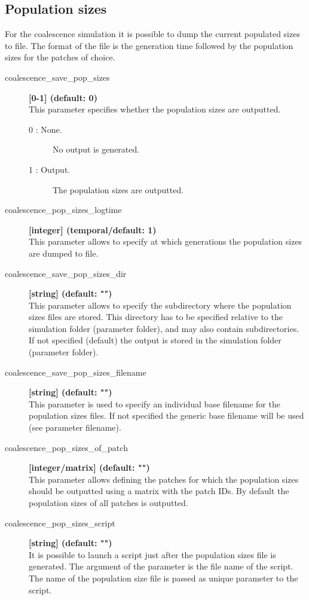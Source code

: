 \documentclass[letterpaper,12pt,oneside]{book}
\begin{document}
\subsection{Population sizes}\label{coalPopSizes}
For the coalescence simulation it is possible to dump the current populated sizes to file. The format of the file is the generation time followed by the population sizes for the patches of choice.

\begin{description} 
	\item[coalescence\_save\_pop\_sizes] \textbf{[0-1] (default: 0)} \\
	This parameter specifies whether the population sizes are outputted.
	\begin{description}
		\item [0 : None.] No output is generated.
		\item [1 : Output.] The population sizes are outputted.
	\end{description} 
	
	\item[coalescence\_pop\_sizes\_logtime] \textbf{[integer] (temporal/default: 1)}\\
	This parameter allows to specify at which generations the population sizes are dumped to file. 
	
\item[coalescence\_save\_pop\_sizes\_dir] \textbf{[string] (default: "")}\\
This parameter allows to specify the subdirectory where the population sizes files are stored. This directory has to be specified relative to the simulation folder (parameter \textsf{folder}), and may also contain subdirectories. If not specified (default) the output is stored in the simulation folder (parameter \textsf{folder}).

\item[coalescence\_save\_pop\_sizes\_filename] \textbf{[string] (default: "")}\\
This parameter is used to specify an individual base filename for the population sizes files. If not specified the generic base filename will be used (see parameter \textsf{filename}).

	\item[coalescence\_pop\_sizes\_of\_patch] \textbf{[integer/matrix] (default: "")}\\
	This parameter allows defining the patches for which the population sizes should be outputted using a matrix with the patch IDs. By default the population sizes of all patches is outputted.
	\item[coalescence\_pop\_sizes\_script] \textbf{[string] (default: "")}\\
	It is possible to launch a script just after the population sizes file is generated. The argument of the parameter is the file name of the script. The name of the population size file is passed as unique parameter to the script. 


\end{description}
\end{document}
